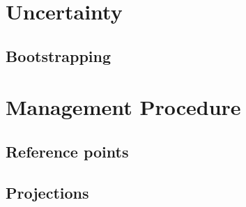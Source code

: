 \documentclass[shortnames,nojss,article]{jss}
\newenvironment{mylisting}
{\begin{list}{}{\setlength{\leftmargin}{1em}}\item\scriptsize\bfseries}
{\end{list}}
\begin{document}
\section{Uncertainty}

\subsection{Bootstrapping}

\begin{mylisting}\begin{center}\begin{minipage}[H]{0.95\textwidth}\begin{shaded} 
\end{shaded}\end{minipage}\end{center}\end{mylisting}


\section{Management Procedure}

\subsection{Reference points}

\begin{mylisting}\begin{center}\begin{minipage}[H]{0.95\textwidth}\begin{shaded} 
\end{shaded}\end{minipage}\end{center}\end{mylisting}

\subsection{Projections}

\begin{mylisting}\begin{center}\begin{minipage}[H]{0.95\textwidth}\begin{shaded} 
\end{shaded}\end{minipage}\end{center}\end{mylisting}
\end{document}
